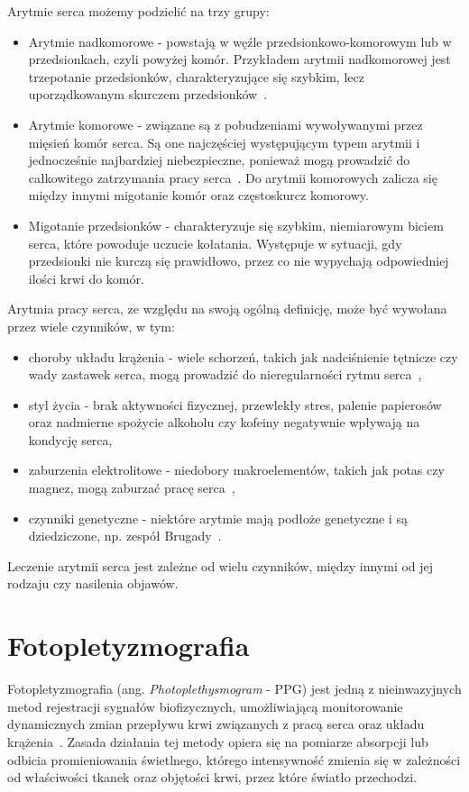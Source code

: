 \documentclass[a4paper,twoside,12pt]{book}
\newcommand{\obcy}[1]{\emph{#1}}
\newcommand{\english}[1]{{\selectlanguage{british}\obcy{#1}}}
\begin{document}
Arytmie serca możemy podzielić na trzy grupy:
\begin{itemize}
	\item Arytmie nadkomorowe - powstają w węźle przedsionkowo-komorowym lub w przedsionkach, czyli powyżej komór. Przykładem arytmii nadkomorowej jest trzepotanie przedsionków, charakteryzujące się szybkim, lecz uporządkowanym skurczem przedsionków~\cite{Apteline2017}.
	\item Arytmie komorowe - związane są z pobudzeniami wywoływanymi przez mięsień komór serca. Są one najczęściej występującym typem arytmii i jednocześnie najbardziej niebezpieczne, ponieważ mogą prowadzić do całkowitego zatrzymania pracy serca~\cite{Tang2017}. Do arytmii komorowych zalicza się między innymi migotanie komór oraz częstoskurcz komorowy.
	\item Migotanie przedsionków - charakteryzuje się szybkim, niemiarowym biciem serca, które powoduje uczucie kołatania. Występuje w sytuacji, gdy przedsionki nie kurczą się prawidłowo, przez co nie wypychają odpowiedniej ilości krwi do komór.
\end{itemize}


Arytmia pracy serca, ze względu na swoją ogólną definicję, może być wywołana przez wiele czynników, w tym:
\begin{itemize}
	\item choroby układu krążenia - wiele schorzeń, takich jak nadciśnienie tętnicze czy wady zastawek serca, mogą prowadzić do nieregularności rytmu serca~\cite{NHLBI2022},
	\item styl życia - brak aktywności fizycznej, przewlekły stres, palenie papierosów oraz nadmierne spożycie alkoholu czy kofeiny negatywnie wpływają na kondycję serca,
	\item zaburzenia elektrolitowe - niedobory makroelementów, takich jak potas czy magnez, mogą zaburzać pracę serca~\cite{NHLBI2022},
	\item czynniki genetyczne - niektóre arytmie mają podłoże genetyczne i są dziedziczone, np. zespół Brugady~\cite{Napolitano2006}.
\end{itemize}

Leczenie arytmii serca jest zależne od wielu czynników, między innymi od jej rodzaju czy nasilenia objawów.



\section{Fotopletyzmografia}
Fotopletyzmografia (ang. \english{Photoplethysmogram} - PPG) jest jedną z nieinwazyjnych metod rejestracji sygnałów biofizycznych, umożliwiającą monitorowanie dynamicznych zmian przepływu krwi związanych z pracą serca oraz układu krążenia~\cite{kyriacou2021ppg}.
Zasada działania tej metody opiera się na pomiarze absorpcji lub odbicia promieniowania świetlnego, którego intensywność zmienia się w zależności od właściwości tkanek oraz objętości krwi, przez które światło przechodzi.
\end{document}
